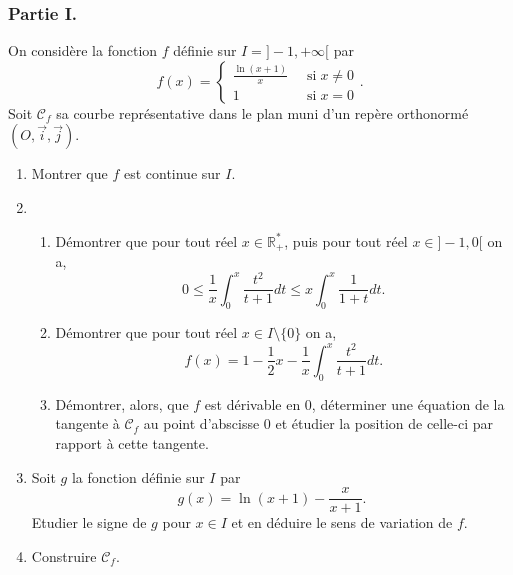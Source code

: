\documentclass[a4paper]{article}
\begin{document}
\subsubsection*{Partie I.}
On considère la fonction $f$ définie sur $I=]-1,+\infty[$ par \[
	f(x)=\begin{cases}
		\frac{\ln(x+1)}{x} \; \;&\text{si}\; x\neq 0\\
		1 \; \; &\text{si}\; x=0
	\end{cases}
.\] 
Soit $\mathcal{C}_f$ sa courbe représentative dans le plan muni d'un repère orthonormé $(O,\vec{i},\vec{j})$.
\begin{enumerate}
	\item Montrer que $f$ est continue sur $I$.
	\item \begin{enumerate}[label=(\alph*)]
		\item Démontrer que pour tout réel $x\in\mathbb{R}_+^*$, puis pour tout réel $x\in]-1,0[$ on a, \[
				0\leq\frac{1}{x}\int_0^x\frac{t^2}{t+1}dt\leq x\int_0^x\frac{1}{1+t}dt
	.\]
\item Démontrer que pour tout réel $x\in I\setminus\{0\}$ on a, \[
		f(x)=1-\frac{1}{2}x-\frac{1}{x}\int_0^x\frac{t^2}{t+1}dt
.\] 
\item Démontrer, alors, que $f$ est dérivable en $0$, déterminer une équation de la tangente à $\mathcal{C}_f$ au point d'abscisse $0$ et étudier la position de celle-ci par rapport à cette tangente.
	\end{enumerate}
\item Soit $g$ la fonction définie sur $I$ par \[
		g(x)=\ln(x+1)-\frac{x}{x+1}
.\] 
Etudier le signe de $g$ pour $x\in I$ et en déduire le sens de variation de $f$.
\item Construire $\mathcal{C}_f$.
\end{enumerate}
\end{document}
